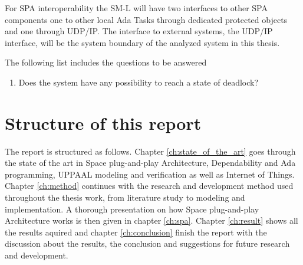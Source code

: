 For SPA interoperability the SM-L will have two interfaces to other SPA
components one to other local Ada Tasks through dedicated protected objects and
one through UDP/IP. The interface to external systems, the UDP/IP interface,
will be the system boundary of the analyzed system in this thesis.


The following list includes the questions to be answered
\begin{enumerate}
    \item Does the system have any possibility to reach a state of deadlock?
\end{enumerate}

\section{Structure of this report}
The report is structured as follows. Chapter \ref{ch:state_of_the_art} goes
through the state of the art in Space plug-and-play Architecture, Dependability
and Ada programming, UPPAAL modeling and verification as well as Internet of
Things.  Chapter \ref{ch:method} continues with the research and development
method used throughout the thesis work, from literature study to modeling and
implementation. A thorough presentation on how Space plug-and-play Architecture 
works is then given in chapter \ref{ch:spa}. Chapter \ref{ch:result} shows all
the results aquired and chapter \ref{ch:conclusion} finish the report with the
discussion about the results, the conclusion and suggestions for future
research and development.

